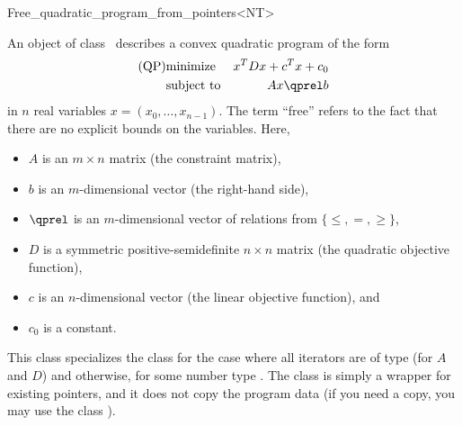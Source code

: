 \begin{ccRefClass}{Free_quadratic_program_from_pointers<NT>}


\ccDefinition
An object of class \ccRefName\ describes a convex quadratic program of the form
\begin{eqnarray*}
\mbox{(QP)}& \mbox{minimize} & x^{T}Dx+c^{T}x+c_0 \\
&\mbox{subject to}   & Ax\qprel b
\end{eqnarray*}
in $n$ real variables $x=(x_0,\ldots,x_{n-1})$. The term ``free'' refers
to the fact that there are no explicit bounds on the variables.
Here, 
\begin{itemize}
\item $A$ is an $m\times n$ matrix (the constraint matrix), 
\item $b$ is an $m$-dimensional vector (the right-hand side),
\item $\qprel$ is an $m$-dimensional vector of relations 
from $\{\leq, =, \geq\}$, 
\item $D$ is a symmetric positive-semidefinite $n\times n$ matrix (the
  quadratic objective function),
\item $c$ is an $n$-dimensional vector (the linear objective
  function), and 
\item $c_0$ is a constant.
\end{itemize}

This class specializes the class
 for the case where all iterators are of type 
 (for
$A$ and $D$) and  otherwise, for some number type . 
The class is simply a wrapper for 
existing pointers, and it does not copy the program data (if you need
a copy, you may use the class ).

\ccIsModel
{}

\ccSeeAlso
{}\\

\end{ccRefClass}
